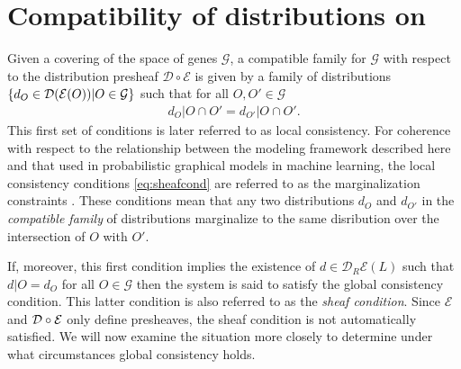 \section{Compatibility of distributions on \gnpm{}}\label{sec:compatibilityofgpms}
Given a covering of the space of genes $\mathcal{G}$, a compatible family for $\mathcal{G}$ with respect to the distribution presheaf $\mathcal{D} \circ \mathcal{E}$ is given by a family of distributions $\{d_O \in \mathcal{D} (\mathcal{E}(O)) | O \in \mathcal{G}\}$ such that for all $O, O' \in \mathcal{G}$
\begin{eqnarray}\label{eq:sheafcond}
d_O|O \cap O' = d_{O'}|O \cap O'.
\end{eqnarray}
This first set of conditions is later referred to as local consistency. For coherence with respect to the relationship between the modeling framework described here and that used in probabilistic graphical models in machine learning, the local consistency conditions \ref{eq:sheafcond} are referred to as the marginalization constraints \cite{Wainwright2007}.  These conditions mean that any two distributions $d_O$ and $d_{O'}$ in the \emph{compatible family} of distributions marginalize to the same disribution over the intersection of $O$ with $O'$.

If, moreover, this first condition implies the existence of $d \in \mathcal{D}_R \mathcal{E}(L)$ such that $d|O = d_O$ for all $O \in \mathcal{G}$ then the system is said to satisfy the global consistency condition.  This latter condition is also referred to as the \emph{sheaf condition}.  Since $\mathcal{E}$ and $\mathcal{D} \circ \mathcal{E}$ only define presheaves, the sheaf condition is not automatically satisfied.  We will now examine the situation more closely to determine under what circumstances global consistency holds.

